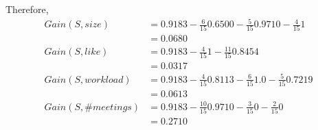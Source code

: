 \documentclass[a4paper,11pt]{article}
\begin{document}
\begin{mlsolution}
Therefore,
\begin{align*}
	Gain(S, size) &= 0.9183 - \frac{6}{15}0.6500 - \frac{5}{15}0.9710 - \frac{4}{15}1\\
					&= 0.0680\\
	Gain(S, like) &= 0.9183 - \frac{4}{15}1 - \frac{11}{15}0.8454\\
					&= 0.0317\\
	Gain(S, workload) &= 0.9183 - \frac{4}{15}0.8113 - \frac{6}{15}1.0 - \frac{5}{15}0.7219\\
					&= 0.0613\\
	Gain(S, \#meetings) &= 0.9183 - \frac{10}{15}0.9710 - \frac{3}{15}0 - \frac{2}{15}0\\
					&= 0.2710 \\
\end{align*}


\end{mlsolution}
\end{document}
